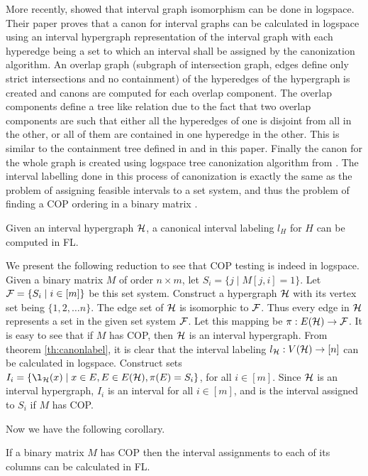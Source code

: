 \documentclass{llncs}
\def\cF{{\cal F}}
\def\cH{{\cal H}}
\begin{document}
\noindent
More recently, \cite{kklv10} showed that interval graph isomorphism can be done in
logspace. Their paper proves that a canon for interval graphs can be
calculated in logspace using an interval hypergraph representation of the
interval graph with each hyperedge being a set to which an interval shall be
assigned by the canonization algorithm. An overlap graph (subgraph of
intersection graph, edges define only strict intersections and no
containment) of the hyperedges of the hypergraph is created and canons
are computed for each overlap component. The overlap components define
a tree like relation due to the fact that two overlap components are
such that either all the hyperedges of one is disjoint from all in the other,
or all of them are contained in one hyperedge in the other. This is
similar to the containment tree defined in \cite{nsnrs09} and in this paper. Finally the
canon for the whole graph is created using logspace tree canonization
algorithm from \cite{sl92}. The interval labelling done in this
process of canonization is exactly the same as the problem of
assigning feasible intervals to a set system, and thus the problem of
finding a COP ordering in a binary matrix \cite{nsnrs09}.

\begin{theorem} 
\label{th:canonlabel}
Given an interval hypergraph $\cH$, a canonical interval labeling $l_H$ 
for $H$ can be computed in FL.
\end{theorem}


We present the following reduction to see that COP testing is
indeed in logspace. Given a binary matrix $M$ of order $n \times m$,
let $S_i = \{j \mid M[j,i]=1 \}$. Let $\cF = \{S_i \mid i \in [m] \}$
be this set system. Construct a hypergraph $\cH$ with its vertex set
being $\{1, 2, \dots n\}$. The edge set of $\cH$ is isomorphic to
$\cF$. Thus every edge in $\cH$ represents a set in the given set
system $\cF$. Let this mapping be $\pi: E(\cH) \rightarrow \cF$. It is
easy to see that if $M$ has COP, then $\cH$ is an interval
hypergraph. From theorem \ref{th:canonlabel}, it is clear that the
interval labeling $l_{\cH}: V(\cH) \rightarrow [n]$ can be calculated
in logspace. Construct sets $I_i = \{ \l_{\cH}(x) \mid x \in E, E \in
E(\cH), \pi(E) = S_i\}$, for all $i \in [m]$. Since $\cH$ is an
interval hypergraph, $I_i$ is an interval for all $i \in [m]$, and is
the interval assigned to $S_i$ if $M$ has COP.

Now we have the following corollary.
\begin{corollary}
\label{cor:coplog}
  If a binary matrix $M$ has COP then the interval assignments to each
  of its columns can be calculated in FL.
\end{corollary}
\end{document}

